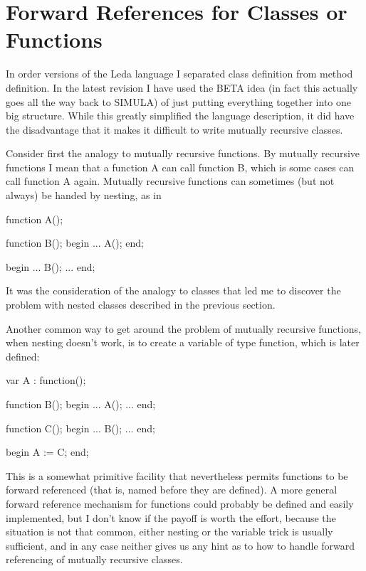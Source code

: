 \section{Forward References for Classes or Functions}

In order versions of the Leda language I separated class definition
from method definition.  In the latest revision I have used the
BETA idea (in fact this actually goes all the way back to SIMULA) of just
putting everything together into one big structure.
While this greatly simplified the language description, it did have
the disadvantage that it makes it
difficult to write mutually recursive classes.

Consider first the analogy to mutually recursive functions.
By mutually recursive functions I mean that a function
A can call function B, which is some cases can call function A again.
Mutually recursive functions can sometimes (but not always) be handed
by nesting, as in
\begin{cprog}

	function A();

		function B();
		begin
			...
			A();
		end;

	begin
		...
		B();
		...
	end;	

\end{cprog}
It was the consideration of the analogy to classes that led me to discover
the problem with nested classes described in the previous section.

Another common way to get around the problem of mutually recursive
functions, when nesting doesn't work, is to create a variable of
type function, which is later defined:

\begin{cprog}

	var
		A : function();

	function B();
	begin
		...
		A();
		...
	end;

	function C();
	begin
		...
		B();
		...
	end;

	begin
		A := C;
	end;

\end{cprog}
This is a somewhat primitive facility that nevertheless permits functions
to be forward referenced (that is, named before they are defined).
A more general forward reference mechanism for functions could probably
be defined and easily implemented, but I don't know if the payoff is
worth the effort, because the situation is not that common,
either nesting or the variable trick is usually sufficient, and in
any case neither gives us any hint as to how to handle forward
referencing of mutually recursive classes.

